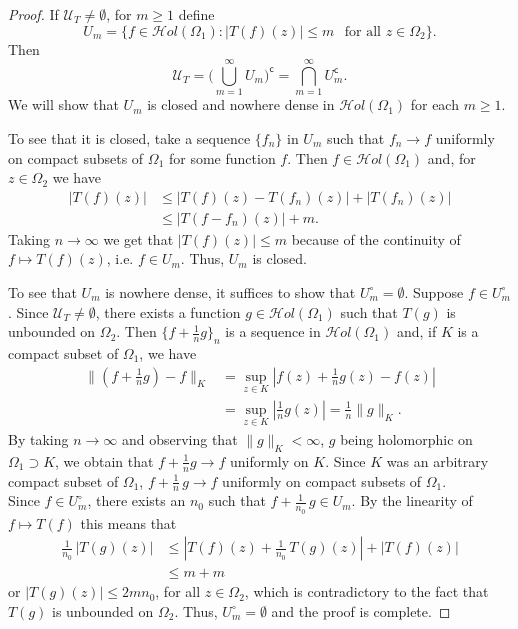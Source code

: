 \documentclass[11pt,twoside,a4paper]{article}
\theoremstyle{remark}
\newcommand{\hol}{{\mathcal Hol}}
\begin{document}
\begin{proof}
If $\mathcal{U}_T \neq \emptyset$, for $m \geq 1$ define
\begin{equation*}
  U_m= \big\{f \in \hol(\Omega_1): |T(f)(z)| \leq m \hspace{5pt} \text{ for all } z \in \Omega_2 \big\}.
\end{equation*}
  Then
  \begin{equation*}
  \mathcal{U}_T= \Big(\bigcup\limits_{m=1}^{\infty}U_m \Big)^{\mathsf{c}}= \bigcap\limits_{m=1}^{\infty}U_m^{\mathsf{c}}.
  \end{equation*}
  We will show that $U_m$ is closed and nowhere dense in $\hol(\Omega_1)$ for each $m \geq 1$.
  \par
  To see that it is closed, take a sequence $\{f_n\}$ in $U_m$ such that $f_n \longrightarrow f$ uniformly on compact subsets of $\Omega_1$ for some function $f$. Then $f \in \hol(\Omega_1)$ and, for $z \in \Omega_2$ we have
  \begin{align*}
    |T(f)(z)| & \leq |T(f)(z)-T(f_n)(z)| + |T(f_n)(z)|\\
    & \leq |T(f-f_n)(z)| +m.
  \end{align*}
  Taking $n \rightarrow \infty$ we get that $|T(f)(z)| \leq m$ because of the continuity of $ f \mapsto T(f)(z)$, i.e. $f \in U_m$. Thus, $U_m$ is closed.\par
  To see that $U_m$ is nowhere dense, it suffices to show that $U_m^{\circ}= \emptyset$. Suppose $f \in U_m^{\circ} $. Since $\mathcal{U}_T \neq \emptyset$, there exists a function $g \in \hol(\Omega_1)$ such that $T(g)$ is unbounded on $\Omega_2$. Then $\{f+\tfrac{1}{n}g\}_n$ is a sequence in $\hol(\Omega_1)$ and, if $K$ is a compact subset of $\Omega_1$, we have
  \begin{align*}
    \| (f+\tfrac{1}{n}g)-f\|_K &= \sup\limits_{z \in K} |f(z)+\frac{1}{n} g(z)-f(z)| \\ &= \sup\limits_{z \in K}|\frac{1}{n}g(z)|=\frac{1}{n} \|g\|_K .
  \end{align*}
  By taking $n \rightarrow \infty$ and observing that $\|g\|_K < \infty$,  $g$ being holomorphic on $\Omega_1 \supset K$, we obtain that  $f+\frac{1}{n}g \longrightarrow f$ uniformly on $K$. Since $K$ was an arbitrary compact subset of $\Omega_1$, $f+\tfrac{1}{n} \hspace{2pt}g \longrightarrow f$ uniformly on compact subsets of $\Omega_1$. \\
  Since $f \in U_m^{\circ}$, there exists an $n_0$ such that $f+\tfrac{1}{n_0} \hspace{2pt}g \in U_m$. By the linearity of $f \mapsto T(f)$ this means that
  \begin{align*}
    \tfrac{1}{n_0} \hspace{2pt}|T(g)(z)| & \leq |T(f)(z)+\tfrac{1}{n_0} \hspace{2pt} T(g)(z)|+|T(f)(z)| \\
    & \leq m+m
  \end{align*}
  or $|T(g)(z)| \leq 2mn_0$, for all $z \in \Omega_2$, which is contradictory to the fact that $T(g)$ is unbounded on $\Omega_2$. Thus, $U_m^{\circ}= \emptyset$ and the proof is complete.
\end{proof}
\end{document}
